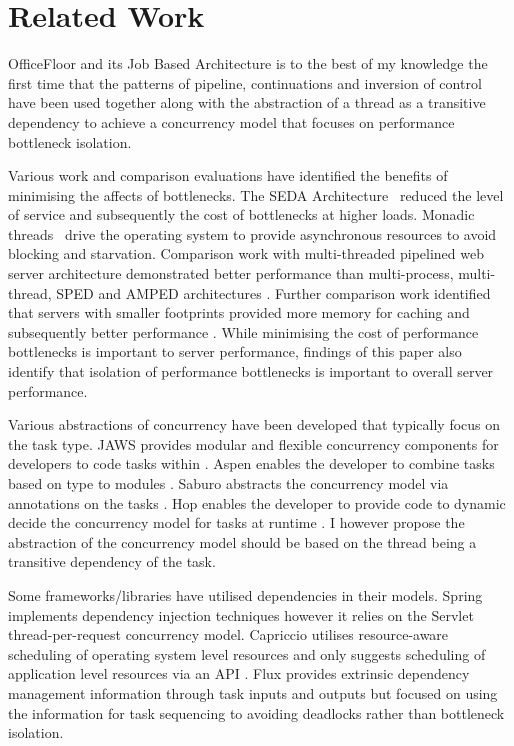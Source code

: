 \documentclass[conference]{ieee/IEEEtran}
\begin{document}
\section{Related Work}
OfficeFloor and its Job Based Architecture is to the best of my knowledge the
first time that the patterns of pipeline, continuations and inversion of control
have been used together along with the abstraction of a thread as a transitive
dependency to achieve a concurrency model that focuses on performance bottleneck
isolation.

Various work and comparison evaluations have identified the benefits of
minimising the affects of bottlenecks.  The SEDA Architecture~\cite{seda}
reduced the level of service and subsequently the cost of bottlenecks at higher
loads.  Monadic threads~\cite{monadic-thread} drive the operating system to
provide asynchronous resources to avoid blocking and starvation.  Comparison
work with multi-threaded pipelined web server architecture demonstrated better
performance than multi-process, multi-thread, SPED and AMPED architectures
\cite{multithread-pipeline}.  Further comparison work identified that servers
with smaller footprints provided more memory for caching and subsequently better
performance \cite{low-server-footprint}.  While minimising the cost of
performance bottlenecks is important to server performance, findings of this
paper also identify that isolation of performance bottlenecks is important to
overall server performance.

Various abstractions of concurrency have been developed that typically focus on
the task type.  JAWS provides modular and flexible concurrency components for
developers to code tasks within \cite{jaws}.  Aspen enables the developer to
combine tasks based on type to modules \cite{aspen}.  Saburo abstracts the
concurrency model via annotations on the tasks \cite{saburo}.  Hop enables the
developer to provide code to dynamic decide the concurrency model for tasks at
runtime \cite{hop}.  I however propose the abstraction of the concurrency model
should be based on the thread being a transitive dependency of the task.

Some frameworks/libraries have utilised dependencies in their models.  Spring
implements dependency injection techniques \cite{ioc} however it relies on the
Servlet thread-per-request concurrency model.  Capriccio utilises resource-aware
scheduling of operating system level resources and only suggests scheduling of
application level resources via an API \cite{capriccio}.  Flux \cite{flux}
provides extrinsic dependency management information through task inputs and
outputs but focused on using the information for task sequencing to avoiding
deadlocks rather than bottleneck isolation.
\end{document}
